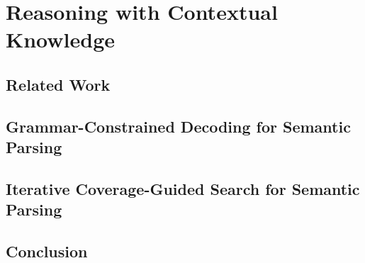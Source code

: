 \documentclass[hidelinks,12pt]{cmuthesis}
\begin{document}
\part{Reasoning with Contextual Knowledge}
\chapter{Related Work}
\label{chapter:reasoning_related_work}

\chapter{Grammar-Constrained Decoding for Semantic Parsing}
\label{chapter:wikitables}

\chapter{Iterative Coverage-Guided Search for Semantic Parsing}
\label{chapter:nlvr}

\chapter{Conclusion}
\label{chapter:conclusion}


%

\backmatter


\renewcommand{\bibsection}{\chapter{\bibname}}

\end{document}
